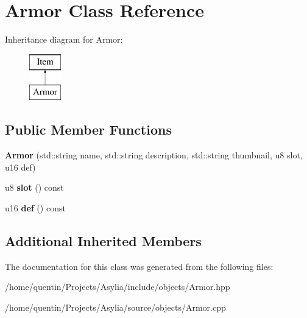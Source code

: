 \hypertarget{classArmor}{\section{Armor Class Reference}
\label{classArmor}
}
Inheritance diagram for Armor\-:\begin{figure}[H]
\begin{center}
\leavevmode
\includegraphics[height=2.000000cm]{classArmor}
\end{center}
\end{figure}
\subsection*{Public Member Functions}
\begin{DoxyCompactItemize}
\item 
\hypertarget{classArmor_a8c42e1c1a19f27b5728bf36f8c509d5a}{{\bfseries Armor} (std\-::string name, std\-::string description, std\-::string thumbnail, u8 slot, u16 def)}\label{classArmor_a8c42e1c1a19f27b5728bf36f8c509d5a}

\item 
\hypertarget{classArmor_a7e46068e1b88c09db3dedcbe1bf9a07d}{u8 {\bfseries slot} () const }\label{classArmor_a7e46068e1b88c09db3dedcbe1bf9a07d}

\item 
\hypertarget{classArmor_a2eff0e2ed2de67be709af24e0f609a49}{u16 {\bfseries def} () const }\label{classArmor_a2eff0e2ed2de67be709af24e0f609a49}

\end{DoxyCompactItemize}
\subsection*{Additional Inherited Members}


The documentation for this class was generated from the following files\-:\begin{DoxyCompactItemize}
\item 
/home/quentin/\-Projects/\-Asylia/include/objects/Armor.\-hpp\item 
/home/quentin/\-Projects/\-Asylia/source/objects/Armor.\-cpp\end{DoxyCompactItemize}
